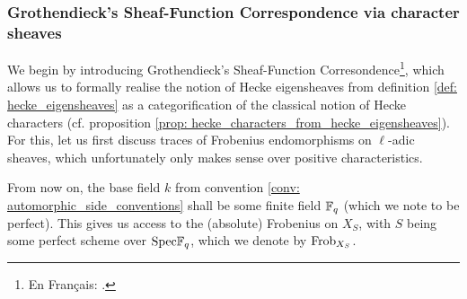         \subsubsection{Grothendieck's Sheaf-Function Correspondence via character sheaves}
            We begin by introducing Grothendieck's Sheaf-Function Corresondence\footnote{En Français: .}, which allows us to formally realise the notion of Hecke eigensheaves from definition \ref{def: hecke_eigensheaves} as a categorification of the classical notion of Hecke characters (cf. proposition \ref{prop: hecke_characters_from_hecke_eigensheaves}). For this, let us first discuss traces of Frobenius endomorphisms on $\ell$-adic sheaves, which unfortunately only makes sense over positive characteristics.
            \begin{convention} \label{conv: frobenii}
                From now on, the base field $k$ from convention \ref{conv: automorphic_side_conventions} shall be some finite field $\mathbb{F}_q$ (which we note to be perfect). This gives us access to the (absolute) Frobenius on $X_S$, with $S$ being some perfect scheme over $\mathrm{Spec} \mathbb{F}_q$, which we denote by $\mathrm{Frob}_{X_S}$.
            \end{convention}
            
